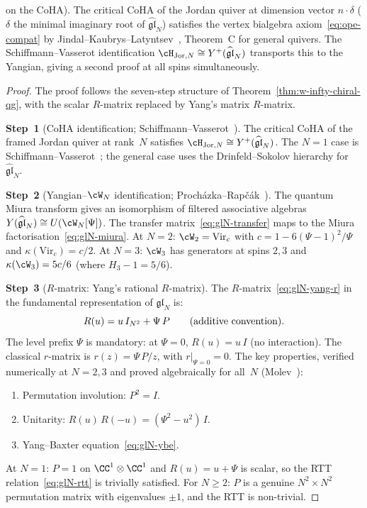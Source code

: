 \begin{theorem}
\begin{enumerate}[label=\textup{(\alph*)}]
{  on the CoHA\textup{)}.}
  The critical CoHA of the Jordan quiver at dimension
  vector $n \cdot \delta$ ($\delta$ the minimal imaginary
  root of $\widehat{\mathfrak{gl}}_N$) satisfies the vertex
  bialgebra axiom~\eqref{eq:ope-compat} by
  Jindal--Kaubrys--Latyntsev~\textup{\cite{JKL26}},
  Theorem~C for general quivers. The
  Schiffmann--Vasserot identification
  $\cH_{\mathrm{Jor},N} \cong Y^+(\widehat{\mathfrak{gl}}_N)$
  transports this to the Yangian, giving a second proof
  at all spins simultaneously.
\end{enumerate}
\end{theorem}

\begin{proof}
The proof follows the seven-step structure of
Theorem~\ref{thm:w-infty-chiral-qg}, with the scalar
$R$-matrix replaced by Yang's matrix $R$-matrix.

\medskip
\noindent
\textbf{Step~1}
(CoHA identification; Schiffmann--Vasserot~\cite{SV13}).
The critical CoHA of the framed Jordan quiver at
rank~$N$ satisfies
$\cH_{\mathrm{Jor},N} \cong Y^+(\widehat{\mathfrak{gl}}_N)$.
The $N = 1$ case is
Schiffmann--Vasserot~\cite{SV13}; the general case
uses the Drinfeld--Sokolov hierarchy for
$\widehat{\mathfrak{gl}}_N$.

\medskip
\noindent
\textbf{Step~2}
(Yangian--$\cW_N$ identification;
Proch\'azka--Rap\v{c}\'ak~\cite{PR19}).
The quantum Miura transform gives an isomorphism of
filtered associative algebras
$Y(\widehat{\mathfrak{gl}}_N) \cong U(\cW_N[\Psi])$.
The transfer matrix~\eqref{eq:glN-transfer}
maps to the Miura
factorisation~\eqref{eq:glN-miura}.
At $N = 2$: $\cW_2 = \mathrm{Vir}_c$ with
$c = 1 - 6(\Psi - 1)^2/\Psi$ and
$\kappa(\mathrm{Vir}_c) = c/2$.
At $N = 3$: $\cW_3$ has generators at spins $2, 3$ and
$\kappa(\cW_3) = 5c/6$ (where $H_3 - 1 = 5/6$).

\medskip
\noindent
\textbf{Step~3}
($R$-matrix: Yang's rational $R$-matrix).
The $R$-matrix~\eqref{eq:glN-yang-r} in the fundamental
representation of $\mathfrak{gl}_N$ is:
\[
  R(u) = u\, I_{N^2} + \Psi\, P
  \qquad \textup{(additive convention)}.
\]
The level prefix $\Psi$ is mandatory: at $\Psi = 0$,
$R(u) = u\, I$ (no interaction). The classical
$r$-matrix is $r(z) = \Psi\, P/z$, with
$r|_{\Psi = 0} = 0$.
The key properties, verified numerically at $N = 2, 3$ and
proved algebraically for all~$N$
(Molev~\cite{Molev07}):
\begin{enumerate}[label=\textup{(\roman*)}]
\item Permutation involution: $P^2 = I$.
\item Unitarity: $R(u)\, R(-u) = (\Psi^2 - u^2)\, I$.
\item Yang--Baxter equation~\eqref{eq:glN-ybe}.
\end{enumerate}
At $N = 1$: $P = 1$ on $\CC^1 \otimes \CC^1$ and
$R(u) = u + \Psi$ is scalar, so the RTT
relation~\eqref{eq:glN-rtt} is trivially satisfied.
For $N \geq 2$: $P$ is a genuine $N^2 \times N^2$
permutation matrix with eigenvalues $\pm 1$, and the
RTT is non-trivial.


\end{proof}
